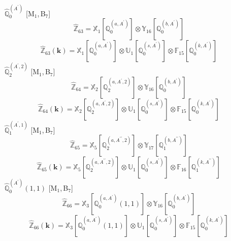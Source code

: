 \documentclass[fleqn,10pt,landscape]{article}
\begin{document}
\begin{itemize}
\begin{dmath*}
\end{dmath*}
\vspace{4mm}
\noindent {} $\,\,\,\hat{\mathbb{Q}}_{0}^{(A^{\prime})}$ [M$_{1}$,\,B$_{7}$]
\begin{dmath*}
\hat{\mathbb{Z}}_{63}=\mathbb{X}_{1}[\mathbb{Q}_{0}^{(a,A^{\prime})}] \otimes\mathbb{Y}_{16}[\mathbb{Q}_{0}^{(b,A^{\prime})}]
\end{dmath*}
\begin{dmath*}
\hat{\mathbb{Z}}_{63}(\bm{k})=\mathbb{X}_{1}[\mathbb{Q}_{0}^{(a,A^{\prime})}] \otimes\mathbb{U}_{1}[\mathbb{Q}_{0}^{(s,A^{\prime})}] \otimes\mathbb{F}_{15}[\mathbb{Q}_{0}^{(k,A^{\prime})}]
\end{dmath*}
\vspace{4mm}
\noindent {} $\,\,\,\hat{\mathbb{Q}}_{2}^{(A^{\prime},2)}$ [M$_{1}$,\,B$_{7}$]
\begin{dmath*}
\hat{\mathbb{Z}}_{64}=\mathbb{X}_{2}[\mathbb{Q}_{2}^{(a,A^{\prime},2)}] \otimes\mathbb{Y}_{16}[\mathbb{Q}_{0}^{(b,A^{\prime})}]
\end{dmath*}
\begin{dmath*}
\hat{\mathbb{Z}}_{64}(\bm{k})=\mathbb{X}_{2}[\mathbb{Q}_{2}^{(a,A^{\prime},2)}] \otimes\mathbb{U}_{1}[\mathbb{Q}_{0}^{(s,A^{\prime})}] \otimes\mathbb{F}_{15}[\mathbb{Q}_{0}^{(k,A^{\prime})}]
\end{dmath*}
\vspace{4mm}
\noindent {} $\,\,\,\hat{\mathbb{Q}}_{1}^{(A^{\prime},1)}$ [M$_{1}$,\,B$_{7}$]
\begin{dmath*}
\hat{\mathbb{Z}}_{65}=\mathbb{X}_{5}[\mathbb{Q}_{2}^{(a,A^{\prime\prime},2)}] \otimes\mathbb{Y}_{17}[\mathbb{Q}_{1}^{(b,A^{\prime\prime})}]
\end{dmath*}
\begin{dmath*}
\hat{\mathbb{Z}}_{65}(\bm{k})=\mathbb{X}_{5}[\mathbb{Q}_{2}^{(a,A^{\prime\prime},2)}] \otimes\mathbb{U}_{1}[\mathbb{Q}_{0}^{(s,A^{\prime})}] \otimes\mathbb{F}_{16}[\mathbb{Q}_{1}^{(k,A^{\prime\prime})}]
\end{dmath*}
\vspace{4mm}
\noindent {} $\,\,\,\hat{\mathbb{Q}}_{0}^{(A^{\prime})}(1,1)$ [M$_{1}$,\,B$_{7}$]
\begin{dmath*}
\hat{\mathbb{Z}}_{66}=\mathbb{X}_{3}[\mathbb{Q}_{0}^{(a,A^{\prime})}(1,1)] \otimes\mathbb{Y}_{16}[\mathbb{Q}_{0}^{(b,A^{\prime})}]
\end{dmath*}
\begin{dmath*}
\hat{\mathbb{Z}}_{66}(\bm{k})=\mathbb{X}_{3}[\mathbb{Q}_{0}^{(a,A^{\prime})}(1,1)] \otimes\mathbb{U}_{1}[\mathbb{Q}_{0}^{(s,A^{\prime})}] \otimes\mathbb{F}_{15}[\mathbb{Q}_{0}^{(k,A^{\prime})}]

\end{dmath*}
\end{itemize}
\end{document}
